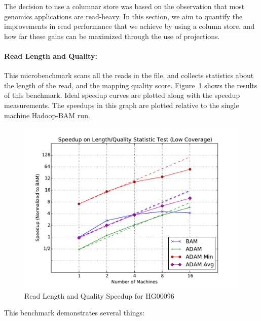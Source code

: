 \documentclass{acm_proc_article-sp}
\begin{document}
The decision to use a columnar store was based on the observation that most genomics applications are read-heavy. In this section,
we aim to quantify the improvements in read performance that we achieve by using a column store, and how far these gains can be
maximized through the use of projections.

\paragraph{Read Length and Quality:}
\label{sec:read-length-and-quality}

This microbenchmark scans all the reads in the file, and collects statistics about the length of the read, and the mapping quality score. Figure~\ref{fig:length-quality} shows
the results of this benchmark. Ideal speedup curves are plotted along with the speedup measurements. The speedups in this graph are plotted relative to the single machine Hadoop-BAM run.

\begin{figure}[h]
\begin{center}
\includegraphics[width=\linewidth]{microbenchmarks/length_and_quality_low_coverage.pdf}
\end{center}
\caption{Read Length and Quality Speedup for HG00096}
\label{fig:length-quality}
\end{figure}

This benchmark demonstrates several things:
\end{document}

